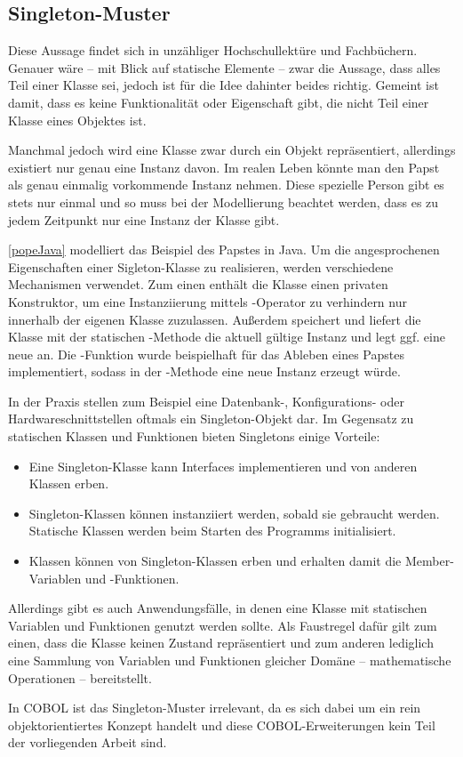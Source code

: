 \subsection{Singleton-Muster}
 \cite{susanne_hackmack_objekte_2018} Diese Aussage findet sich in unzähliger Hochschullektüre und Fachbüchern. Genauer wäre -- mit Blick auf statische Elemente -- zwar die Aussage, dass alles Teil einer Klasse sei, jedoch ist für die Idee dahinter beides richtig. Gemeint ist damit, dass es keine Funktionalität oder Eigenschaft gibt, die nicht Teil einer Klasse \bzw eines Objektes ist.


Manchmal jedoch wird eine Klasse zwar durch ein Objekt repräsentiert, allerdings existiert nur genau eine Instanz davon. Im realen Leben könnte man \zB den Papst als genau einmalig vorkommende Instanz nehmen. Diese spezielle Person gibt es stets nur einmal und so muss bei der Modellierung beachtet werden, dass es zu jedem Zeitpunkt nur eine Instanz der Klasse gibt.

\autoref{popeJava} modelliert das Beispiel des Papstes in Java. Um die angesprochenen Eigenschaften einer Sigleton-Klasse zu realisieren, werden verschiedene Mechanismen verwendet. Zum einen enthält die Klasse einen privaten Konstruktor, um eine Instanziierung mittels -Operator zu verhindern \bzw nur innerhalb der eigenen Klasse zuzulassen. Außerdem speichert und liefert die Klasse mit der statischen -Methode die aktuell gültige Instanz und legt ggf. eine neue an. Die -Funktion wurde beispielhaft für das Ableben eines Papstes implementiert, sodass in der -Methode eine neue Instanz erzeugt würde.

In der Praxis stellen zum Beispiel eine Datenbank-, Konfigurations- oder Hardwareschnittstellen oftmals ein Singleton-Objekt dar. Im Gegensatz zu statischen Klassen und Funktionen bieten Singletons einige Vorteile:

\begin{itemize}
    \item Eine Singleton-Klasse kann Interfaces implementieren und von anderen Klassen erben.
    \item Singleton-Klassen können instanziiert werden, sobald sie gebraucht werden. Statische Klassen werden beim Starten des Programms initialisiert.
    \item Klassen können von Singleton-Klassen erben und erhalten damit die Member-Variablen und -Funktionen.
\end{itemize}

Allerdings gibt es auch Anwendungsfälle, in denen eine Klasse mit statischen Variablen und Funktionen genutzt werden sollte. Als Faustregel dafür gilt zum einen, dass die Klasse keinen Zustand repräsentiert und zum anderen lediglich eine Sammlung von Variablen und Funktionen gleicher Domäne -- \zB mathematische Operationen -- bereitstellt.

In COBOL ist das Singleton-Muster irrelevant, da es sich dabei um ein rein objektorientiertes Konzept handelt und diese COBOL-Erweiterungen kein Teil der vorliegenden Arbeit sind.